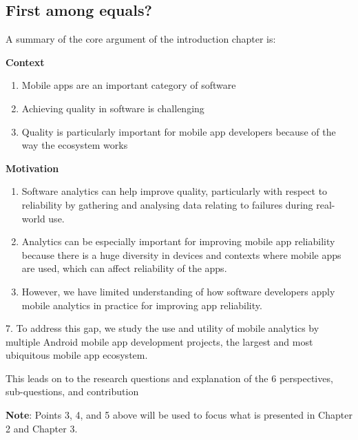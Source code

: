 \subsection{First among equals?}

\begin{kaobox}
A summary of the core argument of the introduction chapter is:

\textbf{Context}
\begin{enumerate}
    \item Mobile apps are an important category of software
    \item Achieving quality in software is challenging
    \item Quality is particularly important for mobile app developers because of the way the ecosystem works
\end{enumerate}

\textbf{Motivation}
\begin{enumerate}[resume]
    \item Software analytics can help improve quality, particularly with respect to reliability by gathering and analysing data relating to failures during real-world use.
    \item Analytics can be especially important for improving mobile app reliability because there is a huge diversity in devices and contexts where mobile apps are used, which can affect reliability of the apps.
    \item However, we have limited understanding of how software developers apply mobile analytics in practice for improving app reliability.
\end{enumerate}

7. To address this gap, we study the use and utility of mobile analytics by multiple Android mobile app development projects, the largest and most ubiquitous mobile app ecosystem.


This leads on to the research questions and explanation of the 6 perspectives, sub-questions, and contribution

\textbf{Note}: Points 3, 4, and 5 above will be used to focus what is presented in Chapter 2 and Chapter 3.
\end{kaobox}

